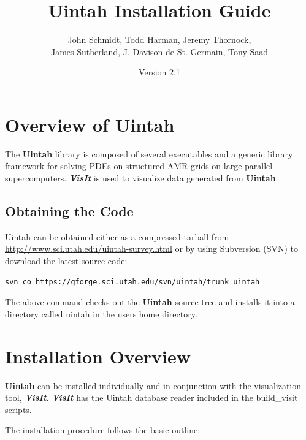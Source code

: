 \documentclass[12pt]{article}
\begin{document}
\title{Uintah Installation Guide}

\author{John Schmidt, Todd Harman, Jeremy Thornock, \\
  James Sutherland, J. Davison de St. Germain, Tony Saad}

\date{Version 2.1}

\maketitle



\newpage

\tableofcontents

\newpage

\section{Overview of Uintah} \label{sec:overview} The \textbf{Uintah}
library is composed of several executables and a generic library
framework for solving PDEs on structured AMR grids on large parallel
supercomputers. \textbf{\emph{VisIt}} is used to visualize data
generated from \textbf{Uintah}.

\subsection{Obtaining the Code}
Uintah can be obtained either as a compressed tarball from
\url{http://www.sci.utah.edu/uintah-survey.html} or by
using Subversion (SVN) to download the latest source code:

\begin{verbatim}
svn co https://gforge.sci.utah.edu/svn/uintah/trunk uintah
\end{verbatim}

The above command checks out the \textbf{Uintah} source tree and
installs it into a directory called uintah in the users home
directory.


\section{Installation Overview}

\textbf{Uintah} can be installed individually and in conjunction with
the visualization tool, \textbf{\emph{VisIt}}.  \textbf{\emph{VisIt}}
has the Uintah database reader included in the build\_visit scripts.

The installation procedure follows the basic outline:
\end{document}
